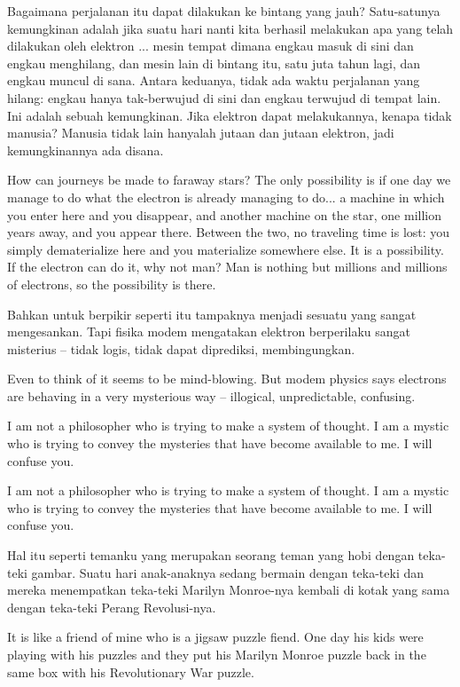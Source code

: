 \bahasa
Bagaimana perjalanan itu dapat dilakukan ke bintang yang jauh? Satu-satunya kemungkinan adalah jika suatu hari nanti kita berhasil melakukan apa yang telah dilakukan oleh elektron ... mesin tempat dimana engkau masuk di sini dan engkau menghilang, dan mesin lain di bintang itu, satu juta tahun lagi, dan engkau muncul di sana. Antara keduanya, tidak ada waktu perjalanan yang hilang: engkau hanya tak-berwujud di sini dan engkau terwujud di tempat lain. Ini adalah sebuah kemungkinan. Jika elektron dapat melakukannya, kenapa tidak manusia? Manusia tidak lain hanyalah jutaan dan jutaan elektron, jadi kemungkinannya ada disana.

\english
How can journeys be made to faraway stars? The only possibility is if one day we
manage to do what the electron is already managing to do... a machine in which you enter here and you disappear, and another machine on the star, one million years away, and you appear there. Between the two, no traveling time is lost: you simply dematerialize here and you materialize somewhere else. It is a possibility. If the electron can do it, why not man? Man is nothing but millions and millions of electrons, so the possibility is there.

\bahasa
Bahkan untuk berpikir seperti itu tampaknya menjadi sesuatu yang sangat mengesankan. Tapi fisika modem mengatakan elektron berperilaku sangat misterius -- tidak logis, tidak dapat diprediksi, membingungkan.

\english
Even to think of it seems to be mind-blowing. But modem physics says electrons are behaving in a very mysterious way -- illogical, unpredictable, confusing.

\bahasa
I am not a philosopher who is trying to make a system of thought. I am a mystic who is trying to convey the mysteries that have become available to me. I will confuse you.

\english
I am not a philosopher who is trying to make a system of thought. I am a mystic who is trying to convey the mysteries that have become available to me. I will confuse you.

\bahasa
Hal itu seperti temanku yang merupakan seorang teman yang hobi dengan teka-teki gambar. Suatu hari anak-anaknya sedang bermain dengan teka-teki dan mereka menempatkan teka-teki Marilyn Monroe-nya kembali di kotak yang sama dengan teka-teki Perang Revolusi-nya.

\english
It is like a friend of mine who is a jigsaw puzzle fiend. One day his kids were playing with his puzzles and they put his Marilyn Monroe puzzle back in the same box with his Revolutionary War puzzle.

